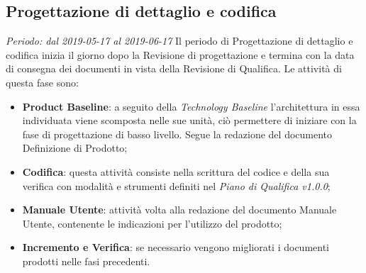 

\subsection{Progettazione di dettaglio e codifica}
\textit{Periodo: dal 2019-05-17 al 2019-06-17}
Il periodo di Progettazione di dettaglio e codifica inizia il giorno dopo la Revisione di progettazione e termina con la data di consegna dei documenti 
in vista della Revisione di Qualifica. Le attività di questa fase sono:
\begin{itemize}
	\item \textbf{Product Baseline}: a seguito della \textit{Technology 
	Baseline} l'architettura in essa individuata viene scomposta nelle sue unità, ciò permettere di iniziare con la fase di progettazione di basso livello. Segue la redazione del documento Definizione di Prodotto;
	\item \textbf{Codifica}: questa attività consiste nella scrittura del 
	codice e della sua verifica con modalità e strumenti definiti nel 
	\textit{Piano di Qualifica v1.0.0};
	\item \textbf{Manuale Utente}: attività volta alla redazione del documento Manuale Utente, contenente le indicazioni per l'utilizzo del prodotto;
	\item \textbf{Incremento e Verifica}: se necessario vengono migliorati i 
	documenti prodotti nelle fasi precedenti.
\end{itemize}



